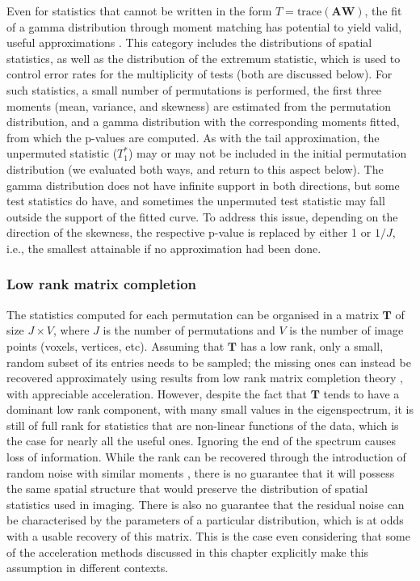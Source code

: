 Even for statistics that cannot be written in the form $T=\text{trace}(\mathbf{A}\mathbf{W})$, the fit of a gamma distribution through moment matching has potential to yield valid, useful approximations \citep{Solomon1978, Minas2014}. This category includes the distributions of spatial statistics, as well as the distribution of the extremum statistic, which is used to control error rates for the multiplicity of tests (both are discussed below). For such statistics, a small number of permutations is performed, the first three moments (mean, variance, and skewness) are estimated from the permutation distribution, and a gamma distribution with the corresponding moments fitted, from which the p-values are computed. As with the tail approximation, the unpermuted statistic ($T^*_1$) may or may not be included in the initial permutation distribution (we evaluated both ways, and return to this aspect below). The gamma distribution does not have infinite support in both directions, but some test statistics do have, and sometimes the unpermuted test statistic may fall outside the support of the fitted curve. To address this issue, depending on the direction of the skewness, the respective p-value is replaced by either 1 or $1/J$, i.e., the smallest attainable if no approximation had been done.

\subsubsection{Low rank matrix completion}

The statistics computed for each permutation can be organised in a matrix $\mathbf{T}$ of size $J \times V$, where $J$ is the number of permutations and $V$ is the number of image points (voxels, vertices, etc). Assuming that $\mathbf{T}$ has a low rank, only a small, random subset of its entries needs to be sampled; the missing ones can instead be recovered approximately using results from low rank matrix completion theory \citep{Candes2009, Candes2010}, with appreciable acceleration. However, despite the fact that $\mathbf{T}$ tends to have a dominant low rank component, with many small values in the eigenspectrum, it is still of full rank for statistics that are non-linear functions of the data, which is the case for nearly all the useful ones. Ignoring the end of the spectrum causes loss of information. While the rank can be recovered through the introduction of random noise with similar moments \citep{Hinrichs2013}, there is no guarantee that it will possess the same spatial structure that would preserve the distribution of spatial statistics used in imaging. There is also no guarantee that the residual noise can be characterised by the parameters of a particular distribution, which is at odds with a usable recovery of this matrix. This is the case even considering that some of the acceleration methods discussed in this chapter explicitly make this assumption in different contexts.

